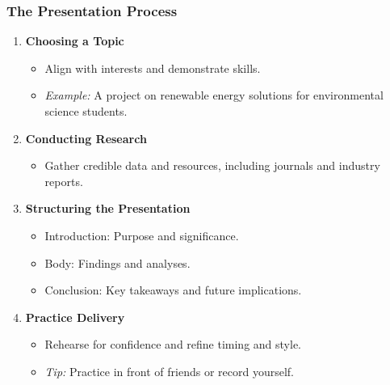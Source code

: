 \documentclass[aspectratio=169]{beamer}
\begin{document}
\begin{frame}[fragile]
    \frametitle{The Presentation Process}
    \begin{enumerate}
        \item \textbf{Choosing a Topic}
            \begin{itemize}
                \item Align with interests and demonstrate skills.
                \item \textit{Example:} A project on renewable energy solutions for environmental science students.
            \end{itemize}
        \item \textbf{Conducting Research}
            \begin{itemize}
                \item Gather credible data and resources, including journals and industry reports.
            \end{itemize}
        \item \textbf{Structuring the Presentation}
            \begin{itemize}
                \item Introduction: Purpose and significance.
                \item Body: Findings and analyses.
                \item Conclusion: Key takeaways and future implications.
            \end{itemize}
        \item \textbf{Practice Delivery}
            \begin{itemize}
                \item Rehearse for confidence and refine timing and style.
                \item \textit{Tip:} Practice in front of friends or record yourself.
            \end{itemize}
    \end{enumerate}
\end{frame}
\end{document}
